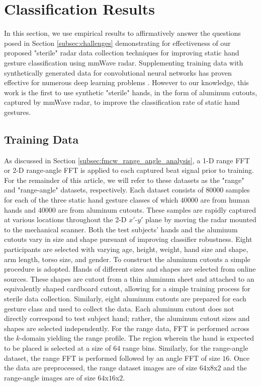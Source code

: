 \documentclass{ieeeaccess}
\begin{document}
\section{Classification Results}
\label{sec:classification_results}
In this section, we use empirical results to affirmatively answer the questions posed in Section \ref{subsec:challenges} demonstrating for effectiveness of our proposed "sterile" radar data collection techniques for improving static hand gesture classification using mmWave radar. Supplementing training data with synthetically generated data for convolutional neural networks has proven effective for numerous deep learning problems \cite{synthetic_data:face,synthetic_data:FaultSeg3D,synthetic_data:fish,synthetic_data:license_plate}. However to our knowledge, this work is the first to use synthetic "sterile" hands, in the form of aluminum cutouts, captured by mmWave radar, to improve the classification rate of static hand gestures.

\subsection{Training Data}
\label{subsec:training_data}
As discussed in Section \ref{subsec:fmcw_range_angle_analysis}, a 1-D range FFT or 2-D range-angle FFT is applied to each captured beat signal prior to training. For the remainder of this article, we will refer to these datasets as the "range" and "range-angle" datasets, respectively. Each dataset consists of $80000$ samples for each of the three static hand gesture classes of which $40000$ are from human hands and $40000$ are from aluminum cutouts. These samples are rapidly captured at various locations throughout the 2-D $x'$-$y'$ plane by moving the radar mounted to the mechanical scanner. Both the test subjects' hands and the aluminum cutouts vary in size and shape pursuant of improving classifier robustness. Eight participants are selected with varying age, height, weight, hand size and shape, arm length, torso size, and gender. To construct the aluminum cutouts a simple procedure is adopted. Hands of different sizes and shapes are selected from online sources. These shapes are cutout from a thin aluminum sheet and attached to an equivalently shaped cardboard cutout, allowing for a simple training process for sterile data collection. Similarly, eight aluminum cutouts are prepared for each gesture class and used to collect the data. Each aluminum cutout does not directly correspond to test subject hand; rather, the aluminum cutout sizes and shapes are selected independently. For the range data, FFT is performed across the $k$-domain yielding the range profile. The region wherein the hand is expected to be placed is selected at a size of $64$ range bins. Similarly, for the range-angle dataset, the range FFT is performed followed by an angle FFT of size $16$. Once the data are preprocessed, the range dataset images are of size $64$x$8$x$2$ and the range-angle images are of size $64$x$16$x$2$. 
\end{document}
